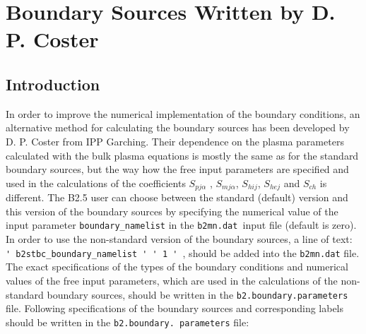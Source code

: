 \documentclass[11pt]{article}
\begin{document}
\bigskip

\section{Boundary Sources Written by D. P. Coster\protect\bigskip}

\bigskip

\subsection{Introduction}

\bigskip

In order to improve the numerical implementation of the boundary conditions,
an alternative method for calculating the boundary sources has been
developed by D. P. Coster from IPP Garching. Their dependence on the plasma
parameters calculated with the bulk plasma equations is mostly the same as
for the standard boundary sources, but the way how the free input parameters
are specified and used in the calculations of the coefficients $S_{pj\alpha}$%
, $S_{mj\alpha}$, $S_{hij}$, $S_{hej}$ and $S_{ch}$ is different. The B2.5
user can choose between the standard (default) version and this version of
the boundary sources by specifying the numerical value of the input
parameter \texttt{boundary\_namelist} in the \texttt{b2mn.dat }input file
(default is zero). In order to use the non-standard version of the boundary
sources, a line of text: \texttt{%
\'{}%
b2stbc\_boundary\_namelist%
\'{}%
\'{}%
1%
\'{}%
}, should be added into the \texttt{b2mn.dat} file. The exact specifications
of the types of the boundary conditions and numerical values of the free
input parameters, which are used in the calculations of the non-standard
boundary sources, should be written in the \texttt{b2.boundary.parameters}
file. Following specifications of the boundary sources and corresponding
labels should be written in the \texttt{b2.boundary. parameters} file:
\end{document}
